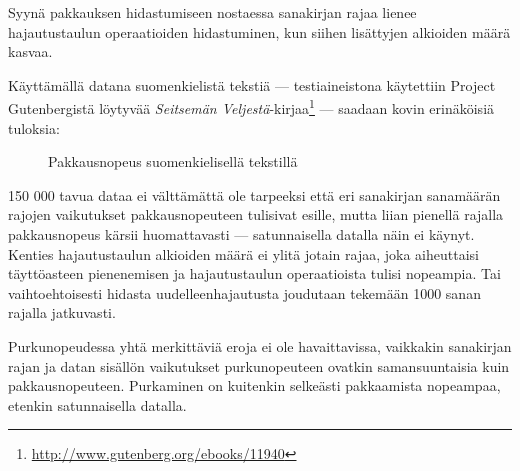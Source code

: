 \documentclass{article}
\begin{document}
Syynä pakkauksen hidastumiseen nostaessa sanakirjan rajaa lienee hajautustaulun operaatioiden hidastuminen, kun siihen lisättyjen alkioiden määrä kasvaa.

Käyttämällä datana suomenkielistä tekstiä --- testiaineistona käytettiin Project Gutenbergistä löytyvää \emph{Seitsemän Veljestä}-kirjaa\footnote{\url{http://www.gutenberg.org/ebooks/11940}} --- saadaan kovin erinäköisiä tuloksia:

\begin{figure}[h]
\centering
{}
\caption{Pakkausnopeus suomenkielisellä tekstillä}
\end{figure}

150 000 tavua dataa ei välttämättä ole tarpeeksi että eri sanakirjan sanamäärän rajojen vaikutukset pakkausnopeuteen tulisivat esille, mutta liian pienellä rajalla pakkausnopeus kärsii huomattavasti --- satunnaisella datalla näin ei käynyt. Kenties hajautustaulun alkioiden määrä ei ylitä jotain rajaa, joka aiheuttaisi täyttöasteen pienenemisen ja hajautustaulun operaatioista tulisi nopeampia. Tai vaihtoehtoisesti hidasta uudelleenhajautusta joudutaan tekemään 1000 sanan rajalla jatkuvasti.

Purkunopeudessa yhtä merkittäviä eroja ei ole havaittavissa, vaikkakin sanakirjan rajan ja datan sisällön vaikutukset purkunopeuteen ovatkin samansuuntaisia kuin pakkausnopeuteen. Purkaminen on kuitenkin selkeästi pakkaamista nopeampaa, etenkin satunnaisella datalla.
\end{document}
